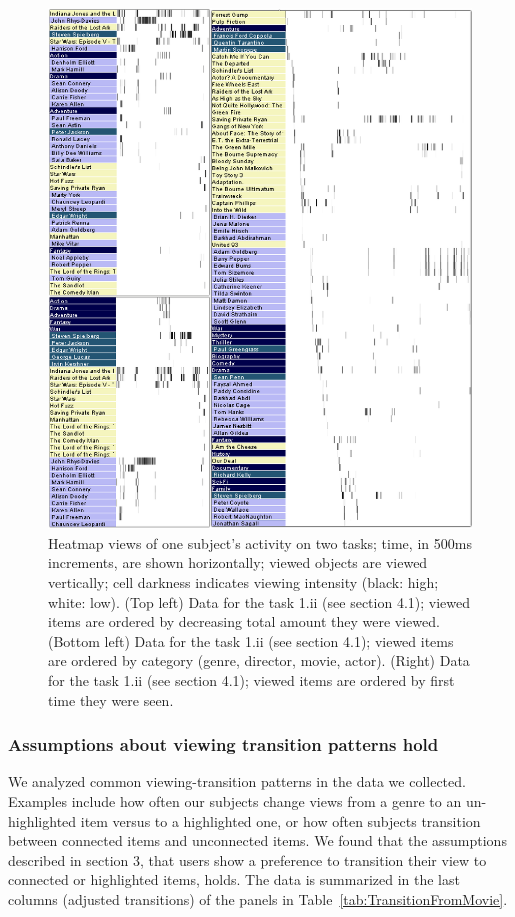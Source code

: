 \begin{figure}[!hbtp]
  \centering
	\includegraphics[height=0.4\textheight]{images/heatmaps.eps}
  \caption{Heatmap views of one subject's activity on two tasks; time, in 500ms increments, are shown horizontally; viewed objects are viewed vertically; cell darkness indicates viewing intensity (black: high; white: low). (Top left) Data for the task 1.ii (see section 4.1); viewed items are ordered by decreasing total amount they were viewed. (Bottom left) Data for the task 1.ii (see section 4.1); viewed items are ordered by category (genre, director, movie, actor). (Right) Data for the task 1.ii (see section 4.1); viewed items are ordered by first time they were seen. 
}
	\label{fig:heatmap}
\end{figure}



\subsubsection{Assumptions about viewing transition patterns hold}
We analyzed common viewing-transition patterns in the data we collected. Examples include how often our subjects change views from a genre to an un-highlighted item versus to a highlighted one, or how often subjects transition between connected items and unconnected items. We found that the assumptions described in section 3, that users show a preference to transition their view to connected or highlighted items, holds. The data is summarized in the last columns  (adjusted transitions) of the panels in Table~\ref{tab:TransitionFromMovie}. 

